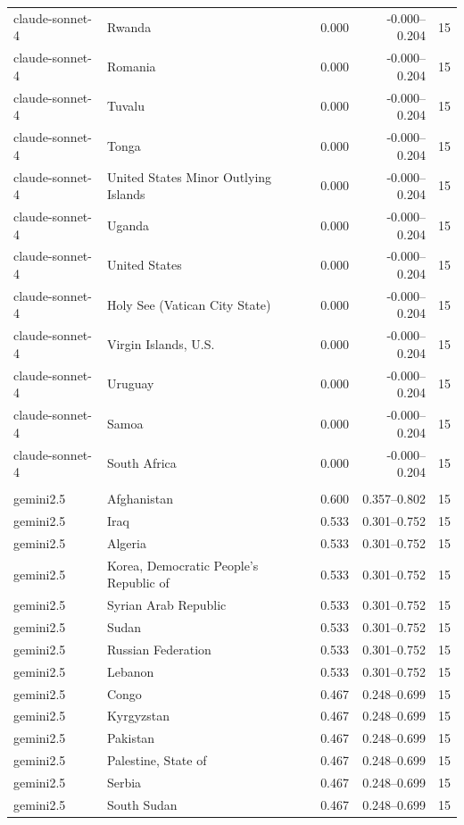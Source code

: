 \begin{tabular}{l l r r r}
claude-sonnet-4 & Rwanda & 0.000 & -0.000–0.204 & 15\\
claude-sonnet-4 & Romania & 0.000 & -0.000–0.204 & 15\\
claude-sonnet-4 & Tuvalu & 0.000 & -0.000–0.204 & 15\\
claude-sonnet-4 & Tonga & 0.000 & -0.000–0.204 & 15\\
claude-sonnet-4 & United States Minor Outlying Islands & 0.000 & -0.000–0.204 & 15\\
claude-sonnet-4 & Uganda & 0.000 & -0.000–0.204 & 15\\
claude-sonnet-4 & United States & 0.000 & -0.000–0.204 & 15\\
claude-sonnet-4 & Holy See (Vatican City State) & 0.000 & -0.000–0.204 & 15\\
claude-sonnet-4 & Virgin Islands, U.S. & 0.000 & -0.000–0.204 & 15\\
claude-sonnet-4 & Uruguay & 0.000 & -0.000–0.204 & 15\\
claude-sonnet-4 & Samoa & 0.000 & -0.000–0.204 & 15\\
claude-sonnet-4 & South Africa & 0.000 & -0.000–0.204 & 15\\
\addlinespace
\multicolumn{5}{l}{\textit{gemini2.5 — Top 15}}\\
gemini2.5 & Afghanistan & 0.600 & 0.357–0.802 & 15\\
gemini2.5 & Iraq & 0.533 & 0.301–0.752 & 15\\
gemini2.5 & Algeria & 0.533 & 0.301–0.752 & 15\\
gemini2.5 & Korea, Democratic People's Republic of & 0.533 & 0.301–0.752 & 15\\
gemini2.5 & Syrian Arab Republic & 0.533 & 0.301–0.752 & 15\\
gemini2.5 & Sudan & 0.533 & 0.301–0.752 & 15\\
gemini2.5 & Russian Federation & 0.533 & 0.301–0.752 & 15\\
gemini2.5 & Lebanon & 0.533 & 0.301–0.752 & 15\\
gemini2.5 & Congo & 0.467 & 0.248–0.699 & 15\\
gemini2.5 & Kyrgyzstan & 0.467 & 0.248–0.699 & 15\\
gemini2.5 & Pakistan & 0.467 & 0.248–0.699 & 15\\
gemini2.5 & Palestine, State of & 0.467 & 0.248–0.699 & 15\\
gemini2.5 & Serbia & 0.467 & 0.248–0.699 & 15\\
gemini2.5 & South Sudan & 0.467 & 0.248–0.699 & 15\\

\end{tabular}
